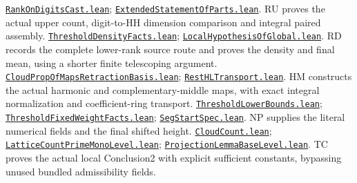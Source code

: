 \documentclass[11pt,a4paper]{article}
\numberwithin{equation}{section}
\theoremstyle{remark}\newtheorem{remark}[theorem]{Remark}
\newcommand{\src}[2]{\href{https://github.com/CocoSgt/riemann-hypothesis-lean/blob/7cbf7a0c32fca1badf05931879a37c3f8a2b03b4/src/#1}{\texttt{#2}}}
\begin{document}
\begin{thebibliography}{99}
 \src{Formalism/SharpRestriction/GrowthBounds/BinomialRatio/RankOnDigitsCast.lean}{RankOnDigitsCast.lean}; \src{Formalism/SharpRestriction/GrowthBounds/BinomialRatio/ExtendedStatementOfParts.lean}{ExtendedStatementOfParts.lean}. RU proves the actual upper count, digit-to-HH dimension comparison and integral paired assembly.
 \src{Formalism/SharpRestriction/GrowthBounds/ColumnSpanDensity/ThresholdDensityFacts.lean}{ThresholdDensityFacts.lean}; \src{Formalism/SharpRestriction/GrowthBounds/ColumnSpanDensity/LocalHypothesisOfGlobal.lean}{LocalHypothesisOfGlobal.lean}. RD records the complete lower-rank source route and proves the density and final mean, using a shorter finite telescoping argument.
 \src{Formalism/SharpRestriction/GrowthBounds/ColumnSpanDensity/CloudPropOfMapsRetractionBasis.lean}{CloudPropOfMapsRetractionBasis.lean}; \src{Formalism/SharpRestriction/GrowthBounds/ColumnSpanDensity/RestHLTransport.lean}{RestHLTransport.lean}. HM constructs the actual harmonic and complementary-middle maps, with exact integral normalization and coefficient-ring transport.
 \src{Formalism/SharpRestriction/GrowthBounds/BinomialRatio/ThresholdLowerBounds.lean}{ThresholdLowerBounds.lean}; \src{Formalism/SharpRestriction/GrowthBounds/ColumnSpanDensity/ThresholdFixedWeightFacts.lean}{ThresholdFixedWeightFacts.lean}; \src{Formalism/SharpRestriction/GrowthBounds/ColumnSpanDensity/SegStartSpec.lean}{SegStartSpec.lean}. NP supplies the literal numerical fields and the final shifted height.
 \src{Formalism/SharpRestriction/GrowthBounds/ColumnSpanDensity/CloudCount.lean}{CloudCount.lean}; \src{Formalism/SharpRestriction/GrowthBounds/ColumnSpanDensity/LatticeCountPrimeMonoLevel.lean}{LatticeCountPrimeMonoLevel.lean}; \src{Formalism/SharpRestriction/GrowthBounds/ProjectionLemmaBaseLevel.lean}{ProjectionLemmaBaseLevel.lean}. TC proves the actual local Conclusion2 with explicit sufficient constants, bypassing unused bundled admissibility fields.

\end{thebibliography}
\end{document}
